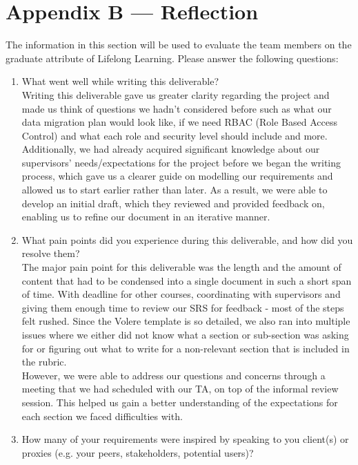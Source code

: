 \documentclass[12pt]{article}
\begin{document}
\newpage{}
\section*{Appendix B --- Reflection}

The information in this section will be used to evaluate the team members on the
graduate attribute of Lifelong Learning.  Please answer the following questions:

\begin{enumerate}
  \item What went well while writing this deliverable?\\
  
  Writing this deliverable gave us greater clarity regarding the project and made us think of questions we hadn't
  considered before such as what our data migration plan would look like, if we need RBAC (Role Based Access Control) and what each role 
  and security level should include and more.\\

  Additionally, we had already acquired significant knowledge about our supervisors' needs/expectations for the project before we began the 
  writing process, which gave us a clearer guide on modelling our requirements and allowed us to start earlier rather than later. As a result, 
  we were able to develop an initial draft, which they reviewed and provided feedback on, enabling us to refine our document in an iterative manner.
  \item What pain points did you experience during this deliverable, and how did you resolve them?\\
  
  The major pain point for this deliverable was the length and the amount of content that had to be condensed into a single document in such a short
  span of time. With deadline for other courses, coordinating with supervisors and giving them enough time to review our SRS for feedback - most of
  the steps felt rushed. Since the Volere template is so detailed, we also ran into multiple issues where we either did not know what a section or
  sub-section was asking for or figuring out what to write for a non-relevant section that is included in the rubric.\\

  However, we were able to address our questions and concerns through a meeting that we had scheduled with our TA, on top of the informal review session.
  This helped us gain a better understanding of the expectations for each section we faced difficulties with.
  \item How many of your requirements were inspired by speaking to you client(s) or proxies (e.g. your peers,
  stakeholders, potential users)?\\


\end{enumerate}
\end{document}
